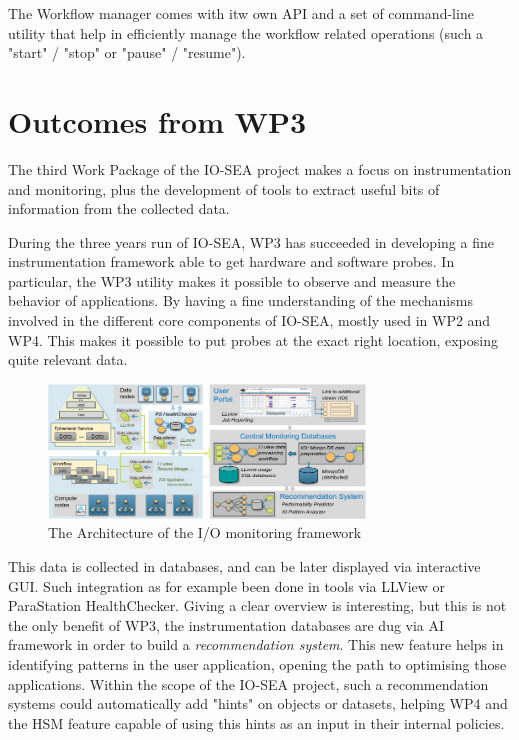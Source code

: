 The Workflow manager comes with itw own API and a set of command-line utility that help in efficiently manage
the workflow related operations (such a "start" / "stop" or "pause" / "resume"). 


\section{Outcomes from WP3}

The third Work Package of the IO-SEA project makes a focus on instrumentation and monitoring, plus the
development of tools to extract useful bits of information from the collected data. 

During the three years run of IO-SEA, WP3 has succeeded in developing a fine instrumentation framework able to
get hardware and software probes. In particular, the WP3 utility makes it possible to observe and measure the 
behavior of applications. By having a fine understanding of the mechanisms involved in the different core
components of IO-SEA, mostly used in WP2 and WP4. This makes it possible to put probes at the exact right 
location, exposing quite relevant data.

\begin{figure}[H]
    \centering
    \includegraphics[width=0.75\textwidth]{FIGS/io_instr.png}
    \caption[I/O Monitoring architecture]{ The Architecture of the I/O monitoring framework}
    \label{fig:instr}
\end{figure}

This data is collected in databases, and can be later displayed via interactive 
GUI. Such integration as for example been done in tools via LLView or ParaStation HealthChecker. Giving a clear
overview is interesting, but this is not the only benefit of WP3, the instrumentation databases are dug via 
AI framework in order to build a \textit{recommendation system}. This new feature helps in identifying patterns
in the user application, opening the path to optimising those applications. Within the scope of the IO-SEA
project, such a recommendation systems could automatically add "hints" on objects or datasets, helping WP4 and
the HSM feature capable of using this hints as an input in their internal policies.

